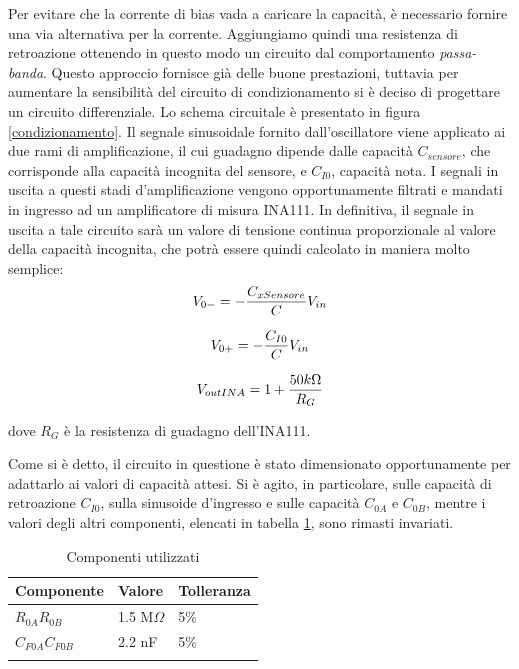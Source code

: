 \documentclass[12pt,a4paper,oneside,openright,italian]{article}
\begin{document}
Per evitare che la corrente di bias vada a caricare la capacit\`a, \`e necessario fornire una via alternativa per la corrente. Aggiungiamo quindi una resistenza di retroazione ottenendo in questo modo un circuito dal comportamento \emph{passa-banda}. Questo approccio fornisce gi\`a delle buone prestazioni, tuttavia per aumentare la sensibilit\`a del circuito di condizionamento si \`e deciso di progettare un circuito differenziale. Lo schema circuitale \`e presentato in figura \ref{condizionamento}. Il segnale sinusoidale fornito dall'oscillatore viene applicato ai due rami di amplificazione, il cui guadagno dipende dalle capacit\`a $C_{sensore}$, che corrisponde alla capacit\`a incognita del sensore, e $C_{I0}$, capacit\`a nota. I segnali in uscita a questi stadi d'amplificazione vengono opportunamente filtrati e mandati in ingresso ad un amplificatore di misura INA111. In definitiva, il segnale in uscita a tale circuito sar\`a un valore di tensione continua proporzionale al valore della capacit\`a incognita, che potr\`a essere quindi calcolato in maniera molto semplice:
\begin{equation}
V_{0-} = - {C_{xSensore} \over C} V_{in}
\end{equation}

\begin{equation}
V_{0+} = - {C_{I0} \over C} V_{in}
\end{equation}

\begin{equation}
V_{outINA} = 1 + {50 k\Omega \over R_G}
\end{equation}

dove $R_G$ \`e la resistenza di guadagno dell'INA111.

Come si \`e detto, il circuito in questione \`e stato dimensionato opportunamente per adattarlo ai valori di capacit\`a attesi. Si \`e agito, in particolare, sulle capacit\`a di retroazione $C_{I0}$, sulla sinusoide d'ingresso e sulle capacit\`a $C_{0A}$ e $C_{0B}$, mentre i valori degli altri componenti, elencati in tabella \ref{components}, sono rimasti invariati.

\begin{longtable}{|p{}|p{}|p{}}
\endhead
\hline
Componente& Valore& Tolleranza\\
\hline
$R_{0A} R_{0B}$ &  1.5 M$\Omega$ & 5\%\\
\hline
$C_{F0A} C_{F0B}$ &  2.2 nF & 5\%\\
\hline
\caption{Componenti utilizzati}
\label{components}
\end{longtable}
\end{document}
